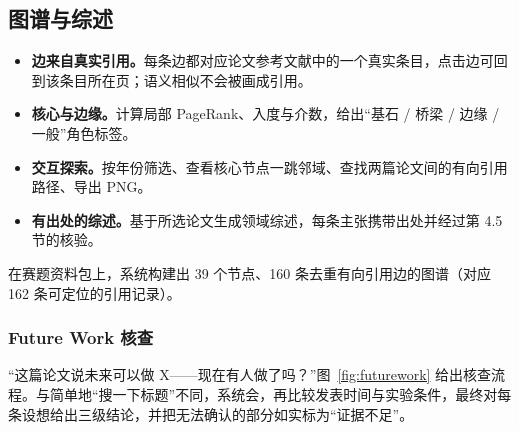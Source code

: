 \subsection{图谱与综述}

\noindent
\begin{minipage}[t]{0.52\linewidth}\vspace{0pt}
  \label{fig:ui-graph}
\end{minipage}\hfill
\begin{minipage}[t]{0.455\linewidth}\vspace{0pt}
\begin{itemize}[leftmargin=1.2em,itemsep=0pt,topsep=0pt]\small
  \item \textbf{边来自真实引用。}每条边都对应论文参考文献中的一个真实条目，点击边可回到该条目所在页；语义相似不会被画成引用。
  \item \textbf{核心与边缘。}计算局部 PageRank、入度与介数，给出“基石 / 桥梁 / 边缘 / 一般”角色标签。
  \item \textbf{交互探索。}按年份筛选、查看核心节点一跳邻域、查找两篇论文间的有向引用路径、导出 PNG。
  \item \textbf{有出处的综述。}基于所选论文生成领域综述，每条主张携带出处并经过第 4.5 节的核验。
\end{itemize}
\end{minipage}

\vspace{6pt}
在赛题资料包上，系统构建出 39 个节点、160 条去重有向引用边的图谱（对应 162 条可定位的引用记录）。

\subsubsection{Future Work 核查}

“这篇论文说未来可以做 X——现在有人做了吗？”图~\ref{fig:futurework} 给出核查流程。与简单地“搜一下标题”不同，系统会，再比较发表时间与实验条件，最终对每条设想给出三级结论，并把无法确认的部分如实标为“证据不足”。

